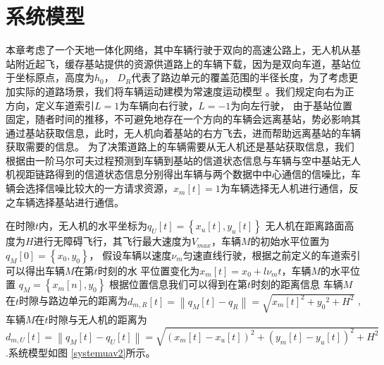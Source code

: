 \section{系统模型}\label{section4-2}
本章考虑了一个天地一体化网络，其中车辆行驶于双向的高速公路上，无人机从基站附近起飞，缓存基站提供的资源供道路上的车辆下载，因为是双向车道，基站位于坐标原点，高度为$h_0$，
$D_R$代表了路边单元的覆盖范围的半径长度，为了考虑更加实际的道路场景，我们将车辆运动建模为常速度运动模型 \cite{Fiore2008TheNS}。我们规定向右为正方向，定义车道索引$L=1$为车辆向右行驶，$L=-1$为向左行驶，
由于基站位置固定，随者时间的推移，不可避免地存在一个方向的车辆会远离基站，势必影响其通过基站获取信息，此时，无人机向着基站的右方飞去，进而帮助远离基站的车辆获取需要的信息。
为了决策道路上的车辆需要从无人机还是基站获取信息，我们根据由一阶马尔可夫过程预测到车辆到基站的信道状态信息与车辆与空中基站无人机视距链路得到的信道状态信息分别得出车辆与两个数据中中心通信的信噪比，车辆会选择信噪比较大的一方请求资源，$x_m\left[t\right]=1$为车辆选择无人机进行通信，反之车辆选择基站进行通信。

在时隙$t$内，无人机的水平坐标为$q_U\left[t\right]=\left\{x_u\left[t\right],y_u\left[t\right]\right\}$
无人机在距离路面高度为$H$进行无障碍飞行，其飞行最大速度为$V_{max}$，车辆$M$的初始水平位置为$q_M\left[0\right]=\left\{x_0,y_0\right\}$，
假设车辆以速度$\nu_m$匀速直线行驶，根据之前定义的车道索引可以得出车辆$M$在第$t$时刻的水
平位置变化为$x_m\left[t\right]=x_0+l\nu_m t$，车辆$M$的水平位置 $q_M=\left\{x_m\left[n\right],y_0\right\}$
根据位置信息我们可以得到在第$t$时刻的距离信息
车辆$M$在$t$时隙与路边单元的距离为${{d}_{m,R}}\left[ t \right]=\left\| {{q}_{M}}\left[ t \right]-{{q}_{R}} \right\|=\sqrt{{{x}_{m}}{{\left[ t \right]}^{2}}+{{y}_{0}}^{2}+{{H}^{2}}}$
,车辆$M$在$t$时隙与无人机的距离为
$
{{d}_{m,U}}\left[ t \right]=\left\| {{q}_{M}}\left[ t \right]-{{q}_{U}}\left[ t \right] \right\|=\sqrt{{{\left( {{x}_{m}}\left[ t \right]-{{x}_{u}}\left[ t \right] \right)}^{2}}+{{\left( {{y}_{m}}\left[ t \right]-{{y}_{u}}\left[ t \right] \right)}^{2}}+{{H}^{2}}}\
$.系统模型如图 \ref{systemuav2}所示。%

